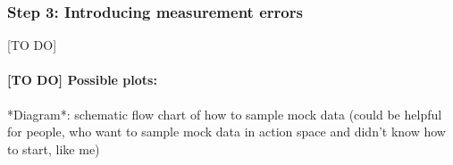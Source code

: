 %



\subsubsection{Step 3: Introducing measurement errors}

[TO DO]

\paragraph{[TO DO] Possible plots:} *Diagram*: schematic flow chart of how to sample mock data (could be helpful for people, who want to sample mock data in action space and didn't know how to start, like me)

